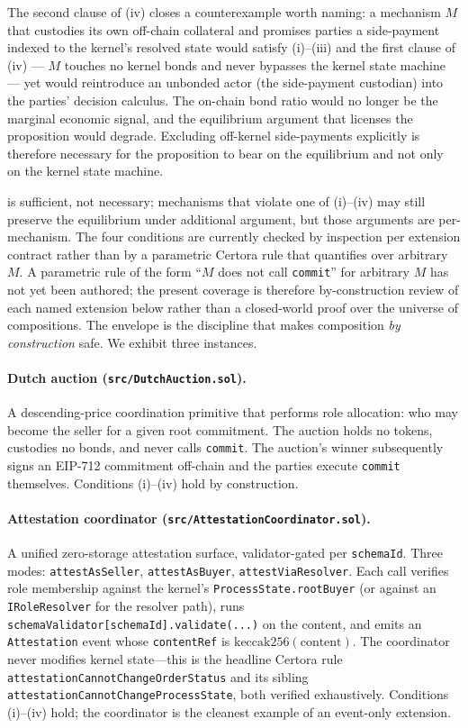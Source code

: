 \documentclass[11pt,a4paper]{article}
\theoremstyle{definition}
\theoremstyle{remark}
\begin{document}
\noindent
The second clause of (iv) closes a counterexample worth naming:
a mechanism $M$ that custodies its own off-chain collateral and
promises parties a side-payment indexed to the kernel's resolved
state would satisfy (i)--(iii) and the first clause of (iv) ---
$M$ touches no kernel bonds and never bypasses the kernel state
machine --- yet would reintroduce an unbonded actor (the
side-payment custodian) into the parties' decision calculus. The
on-chain bond ratio would no longer be the marginal economic
signal, and the equilibrium argument that licenses the
proposition would degrade. Excluding off-kernel side-payments
explicitly is therefore necessary for the proposition to bear on
the equilibrium and not only on the kernel state machine.

 is sufficient, not necessary; mechanisms
that violate one of (i)--(iv) may still preserve the equilibrium
under additional argument, but those arguments are per-mechanism.
The four conditions are currently checked by inspection per
extension contract rather than by a parametric Certora rule that
quantifies over arbitrary $M$. A parametric rule of the form
``$M$ does not call \texttt{commit}'' for arbitrary $M$ has not
yet been authored; the present coverage is therefore by-construction
review of each named extension below rather than a closed-world
proof over the universe of compositions. The envelope is the
discipline that makes composition \emph{by construction} safe.
We exhibit three instances.

\paragraph{Dutch auction (\texttt{src/DutchAuction.sol}).}
A descending-price coordination primitive that performs role
allocation: who may become the seller for a given root commitment.
The auction holds no tokens, custodies no bonds, and never calls
\texttt{commit}. The auction's winner subsequently signs an
EIP-712 commitment off-chain and the parties execute \texttt{commit}
themselves. Conditions (i)--(iv) hold by construction.

\paragraph{Attestation coordinator (\texttt{src/AttestationCoordinator.sol}).}
A unified zero-storage attestation surface, validator-gated per
\texttt{schemaId}. Three modes: \texttt{attestAsSeller},
\texttt{attestAsBuyer}, \texttt{attestViaResolver}. Each call
verifies role membership against the kernel's
\texttt{ProcessState.rootBuyer} (or against an
\texttt{IRoleResolver} for the resolver path), runs
\texttt{schemaValidator[schemaId].validate(...)} on the content, and
emits an \texttt{Attestation} event whose \texttt{contentRef} is
$\mathrm{keccak256}(\text{content})$. The coordinator never modifies
kernel state---this is the headline Certora rule
\texttt{attestationCannotChangeOrderStatus} and its sibling
\texttt{attestationCannotChangeProcessState}, both verified
exhaustively. Conditions (i)--(iv) hold; the coordinator is the
cleanest example of an event-only extension.
\end{document}
